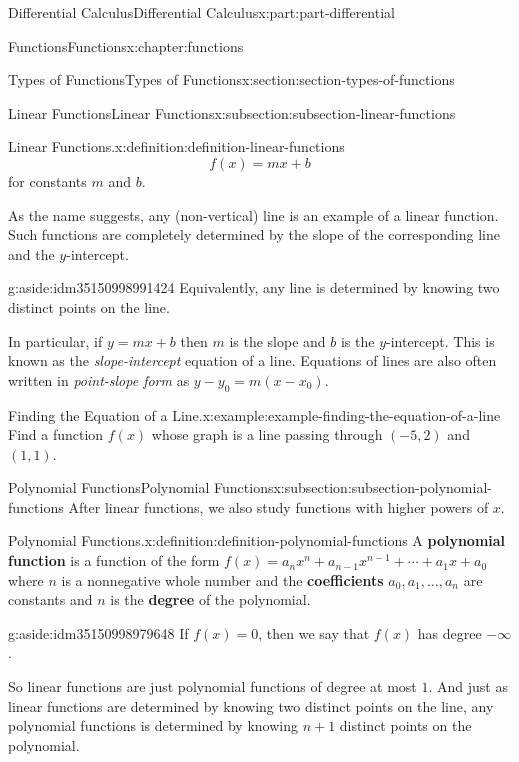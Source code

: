 \documentclass[twoside,10pt,]{book}
\newcommand{\terminology}[1]{\textbf{#1}}
\numberwithin{equation}{part}
\begin{document}
\begin{partptx}{Differential Calculus}{}{Differential Calculus}{}{}{x:part:part-differential}
\begin{chapterptx}{Functions}{}{Functions}{}{}{x:chapter:functions}
\begin{sectionptx}{Types of Functions}{}{Types of Functions}{}{}{x:section:section-types-of-functions}
\begin{subsectionptx}{Linear Functions}{}{Linear Functions}{}{}{x:subsection:subsection-linear-functions}
\begin{definition}{Linear Functions.}{x:definition:definition-linear-functions}
\begin{equation*}
f(x) = mx + b
\end{equation*}
for constants \(m\) and \(b\).%
\end{definition}
As the name suggests, any (non-vertical) line is an example of a linear function. Such functions are completely determined by the slope of the corresponding line and the \(y\)-intercept. \begin{aside}{}{g:aside:idm35150998991424}%
Equivalently, any line is determined by knowing two distinct points on the line.%
\end{aside}
 In particular, if \(y = mx + b\) then \(m\) is the slope and \(b\) is the \(y\)-intercept. This is known as the \emph{slope-intercept} equation of a line. Equations of lines are also often written in \emph{point-slope form} as \(y - y_{0} = m(x - x_{0})\).%
\begin{example}{Finding the Equation of a Line.}{x:example:example-finding-the-equation-of-a-line}%
Find a function \(f(x)\) whose graph is a line passing through \((-5,2)\) and \((1,1)\).%
\end{example}
\end{subsectionptx}
%
%
\typeout{************************************************}
\typeout{************************************************}
%
\begin{subsectionptx}{Polynomial Functions}{}{Polynomial Functions}{}{}{x:subsection:subsection-polynomial-functions}
After linear functions, we also study functions with higher powers of \(x\).%
\begin{definition}{Polynomial Functions.}{x:definition:definition-polynomial-functions}%
%
A \terminology{polynomial function} is a function of the form \(f(x) = a_{n}x^{n} + a_{n-1}x^{n-1} + \cdots + a_{1}x + a_{0}\) where \(n\) is a nonnegative whole number and the \terminology{coefficients} \(a_{0}, a_{1},\ldots, a_{n}\) are constants and \(n\) is the \terminology{degree} of the polynomial.%
\end{definition}
\begin{aside}{}{g:aside:idm35150998979648}%
If \(f(x) = 0\), then we say that \(f(x)\) has degree \(-\infty\).%
\end{aside}
So linear functions are just polynomial functions of degree at most \(1\). And just as linear functions are determined by knowing two distinct points on the line, any polynomial functions is determined by knowing \(n+1\) distinct points on the polynomial.%

\end{subsectionptx}
\end{sectionptx}
\end{chapterptx}
\end{partptx}
\end{document}
